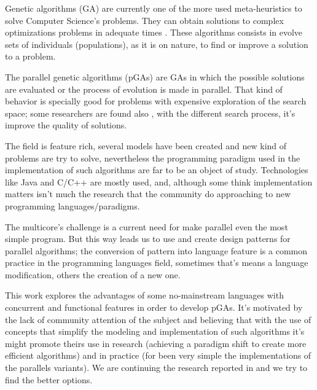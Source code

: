 
\noindent Genetic algorithms (GA) are currently one of the more used meta-heuristics to solve Computer Science’s problems. They can obtain solutions to complex optimizations problems in adequate times \cite{Luque2011}. These algorithms consists in evolve sets of individuals (populations), as it is on nature, to find or improve a solution to a problem.

The parallel genetic algorithms (pGAs) are GAs in which the possible solutions are evaluated or the process of evolution is made in parallel. That kind of behavior is specially good for problems with expensive exploration of the search space; some researchers are found also \cite{Alba2001}, with the different search process, it’s improve the quality of solutions.

The field is feature rich, several models have been created and new kind of problems are try to solve, nevertheless the programming paradigm used in the implementation of such algorithms are far to be an object of study. Technologies like Java and C/C++ are mostly used, and, although some think implementation matters \cite{DBLP:conf/iwann/MereloRACML11} isn’t much the research that the community do approaching to new programming languages/paradigms.

The multicore’s challenge \cite{SutterL05} is a current need for make parallel even the most simple program. But this way leads us to use and create design patterns for parallel algorithms; the conversion of pattern into language feature is a common practice in the programming languages field, sometimes that’s means a language modification, others the creation of a new one.

This work explores the advantages of some no-mainstream languages with concurrent and functional features in order to develop pGAs. It’s motivated by the lack of community attention of the subject and believing that with the use of concepts that simplify the modeling and implementation of such algorithms it’s might promote theirs use in research (achieving a paradigm shift to create more efficient algorithms) and in practice (for been very simple the implementations of the parallels variants). We are continuing the research reported in \cite{DBLP:conf/gecco/CruzGGC13,J.Albert-Cruz2013} and we try to find the better options.

